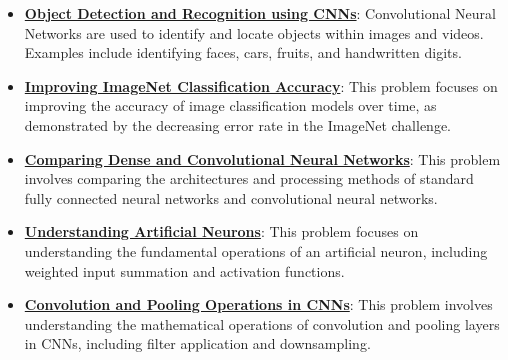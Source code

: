 \documentclass{article}%
\begin{document}
\begin{itemize}[leftmargin=*]%
\item \href{https://purdue.brightspace.com/d2l/common/assets/pdfjs-d2l-dist/1.0.14-legacy/web/viewer.html?file=%2Fcontent%2Fenforced%2F1095467-wl.202510.CS.24300.001%2F09L1-cnn.pdf%3Fou%3D1095467&lang=en-us&container=d2l-fileviewer-rendered-pdf&fullscreen=d2l-fileviewer-rendered-pdf-dialog&height=667#page=2}{\textbf{Object Detection and Recognition using CNNs}}: Convolutional Neural Networks are used to identify and locate objects within images and videos. Examples include identifying faces, cars, fruits, and handwritten digits.%
\item \href{https://purdue.brightspace.com/d2l/common/assets/pdfjs-d2l-dist/1.0.14-legacy/web/viewer.html?file=%2Fcontent%2Fenforced%2F1095467-wl.202510.CS.24300.001%2F09L1-cnn.pdf%3Fou%3D1095467&lang=en-us&container=d2l-fileviewer-rendered-pdf&fullscreen=d2l-fileviewer-rendered-pdf-dialog&height=667#page=3}{\textbf{Improving ImageNet Classification Accuracy}}: This problem focuses on improving the accuracy of image classification models over time, as demonstrated by the decreasing error rate in the ImageNet challenge.%
\item \href{https://purdue.brightspace.com/d2l/common/assets/pdfjs-d2l-dist/1.0.14-legacy/web/viewer.html?file=%2Fcontent%2Fenforced%2F1095467-wl.202510.CS.24300.001%2F09L1-cnn.pdf%3Fou%3D1095467&lang=en-us&container=d2l-fileviewer-rendered-pdf&fullscreen=d2l-fileviewer-rendered-pdf-dialog&height=667#page=4}{\textbf{Comparing Dense and Convolutional Neural Networks}}: This problem involves comparing the architectures and processing methods of standard fully connected neural networks and convolutional neural networks.%
\item \href{https://purdue.brightspace.com/d2l/common/assets/pdfjs-d2l-dist/1.0.14-legacy/web/viewer.html?file=%2Fcontent%2Fenforced%2F1095467-wl.202510.CS.24300.001%2F09L1-cnn.pdf%3Fou%3D1095467&lang=en-us&container=d2l-fileviewer-rendered-pdf&fullscreen=d2l-fileviewer-rendered-pdf-dialog&height=667#page=5}{\textbf{Understanding Artificial Neurons}}: This problem focuses on understanding the fundamental operations of an artificial neuron, including weighted input summation and activation functions.%
\item \href{https://purdue.brightspace.com/d2l/common/assets/pdfjs-d2l-dist/1.0.14-legacy/web/viewer.html?file=%2Fcontent%2Fenforced%2F1095467-wl.202510.CS.24300.001%2F09L1-cnn.pdf%3Fou%3D1095467&lang=en-us&container=d2l-fileviewer-rendered-pdf&fullscreen=d2l-fileviewer-rendered-pdf-dialog&height=667#page=6}{\textbf{Convolution and Pooling Operations in CNNs}}: This problem involves understanding the mathematical operations of convolution and pooling layers in CNNs, including filter application and downsampling.%

\end{itemize}
\end{document}
